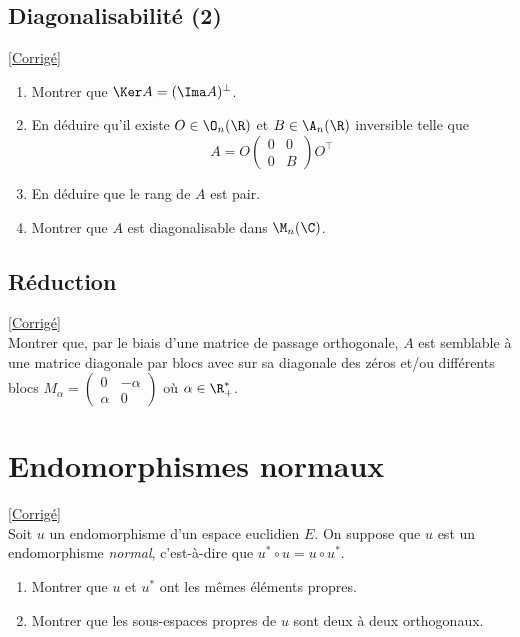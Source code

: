 \documentclass[8pt]{book}
\begin{document}
\subsection{Diagonalisabilité (2)}
\label{Diagonalisabilité (2)}
\textcolor{blue}{\hyperref[Diagonalisabilité (2) corrigé]{[Corrigé]}}\\
\begin{enumerate}[leftmargin=*]
	\item Montrer que $\Ker A=(\Ima A)^\bot$.
	\item En déduire qu'il existe $O\in \O_n(\R)$ et $B\in \A_n(\R)$ inversible telle que
	$$A=O\begin{pmatrix}
		0&0\\
		0&B
	\end{pmatrix}O^\top$$
	\item En déduire que le rang de $A$ est pair.
	\item Montrer que $A$ est diagonalisable dans $\M_n(\C)$.
\end{enumerate}

\subsection{Réduction}
\label{Réduction}
\textcolor{blue}{\hyperref[Réduction corrigé]{[Corrigé]}}\\
Montrer que, par le biais d'une matrice de passage orthogonale, $A$ est semblable à une matrice diagonale par blocs avec sur sa diagonale des zéros et/ou différents blocs $M_\alpha=\begin{pmatrix}
	0&-\alpha\\
	\alpha&0
\end{pmatrix}$ où $\alpha\in \R^*_+$.

\section{Endomorphismes normaux}
\label{Endomorphismes normaux}
\textcolor{blue}{\hyperref[Endomorphismes normaux corrigé]{[Corrigé]}}\\
Soit $u$ un endomorphisme d'un espace euclidien $E$. On suppose que $u$ est un endomorphisme \textit{normal}, c'est-à-dire que $u^*\circ u=u\circ u^*$.
\begin{enumerate}
	\item Montrer que $u$ et $u^*$ ont les mêmes éléments propres.
	\item Montrer que les sous-espaces propres de $u$ sont deux à deux orthogonaux.
\end{enumerate}
\end{document}
